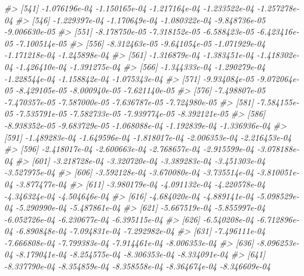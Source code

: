 \documentclass[
]{article}
\newenvironment{Shaded}{\begin{snugshade}}{\end{snugshade}}
\newcommand{\CommentTok}[1]{\textcolor[rgb]{0.56,0.35,0.01}{\textit{#1}}}
\begin{document}
\begin{Shaded}
\begin{Highlighting}[]
\CommentTok{\#\textgreater{} [541] {-}1.076196e{-}04 {-}1.150165e{-}04 {-}1.217164e{-}04 {-}1.233522e{-}04 {-}1.257278e{-}04}
\CommentTok{\#\textgreater{} [546] {-}1.229397e{-}04 {-}1.170649e{-}04 {-}1.080322e{-}04 {-}9.848736e{-}05 {-}9.006630e{-}05}
\CommentTok{\#\textgreater{} [551] {-}8.178750e{-}05 {-}7.318152e{-}05 {-}6.588423e{-}05 {-}6.423416e{-}05 {-}7.100514e{-}05}
\CommentTok{\#\textgreater{} [556] {-}8.312463e{-}05 {-}9.641054e{-}05 {-}1.071929e{-}04 {-}1.171218e{-}04 {-}1.245898e{-}04}
\CommentTok{\#\textgreater{} [561] {-}1.316879e{-}04 {-}1.383451e{-}04 {-}1.418302e{-}04 {-}1.426410e{-}04 {-}1.391275e{-}04}
\CommentTok{\#\textgreater{} [566] {-}1.344333e{-}04 {-}1.290279e{-}04 {-}1.228544e{-}04 {-}1.158842e{-}04 {-}1.075343e{-}04}
\CommentTok{\#\textgreater{} [571] {-}9.934084e{-}05 {-}9.072064e{-}05 {-}8.429105e{-}05 {-}8.000940e{-}05 {-}7.621140e{-}05}
\CommentTok{\#\textgreater{} [576] {-}7.498807e{-}05 {-}7.470357e{-}05 {-}7.587000e{-}05 {-}7.636787e{-}05 {-}7.724980e{-}05}
\CommentTok{\#\textgreater{} [581] {-}7.584155e{-}05 {-}7.535791e{-}05 {-}7.582733e{-}05 {-}7.939774e{-}05 {-}8.392121e{-}05}
\CommentTok{\#\textgreater{} [586] {-}8.938352e{-}05 {-}9.683729e{-}05 {-}1.068088e{-}04 {-}1.192839e{-}04 {-}1.336936e{-}04}
\CommentTok{\#\textgreater{} [591] {-}1.489283e{-}04 {-}1.649596e{-}04 {-}1.818017e{-}04 {-}2.006353e{-}04 {-}2.216453e{-}04}
\CommentTok{\#\textgreater{} [596] {-}2.418017e{-}04 {-}2.600663e{-}04 {-}2.768657e{-}04 {-}2.915599e{-}04 {-}3.078188e{-}04}
\CommentTok{\#\textgreater{} [601] {-}3.218728e{-}04 {-}3.320720e{-}04 {-}3.389283e{-}04 {-}3.451303e{-}04 {-}3.527975e{-}04}
\CommentTok{\#\textgreater{} [606] {-}3.592128e{-}04 {-}3.670080e{-}04 {-}3.735514e{-}04 {-}3.810051e{-}04 {-}3.877477e{-}04}
\CommentTok{\#\textgreater{} [611] {-}3.980179e{-}04 {-}4.091132e{-}04 {-}4.220578e{-}04 {-}4.346324e{-}04 {-}4.504646e{-}04}
\CommentTok{\#\textgreater{} [616] {-}4.684020e{-}04 {-}4.889141e{-}04 {-}5.098529e{-}04 {-}5.290990e{-}04 {-}5.487861e{-}04}
\CommentTok{\#\textgreater{} [621] {-}5.667519e{-}04 {-}5.855997e{-}04 {-}6.052726e{-}04 {-}6.230677e{-}04 {-}6.395115e{-}04}
\CommentTok{\#\textgreater{} [626] {-}6.540208e{-}04 {-}6.712896e{-}04 {-}6.890848e{-}04 {-}7.094831e{-}04 {-}7.292982e{-}04}
\CommentTok{\#\textgreater{} [631] {-}7.496111e{-}04 {-}7.666808e{-}04 {-}7.799383e{-}04 {-}7.914461e{-}04 {-}8.006353e{-}04}
\CommentTok{\#\textgreater{} [636] {-}8.096253e{-}04 {-}8.179041e{-}04 {-}8.254575e{-}04 {-}8.306353e{-}04 {-}8.334091e{-}04}
\CommentTok{\#\textgreater{} [641] {-}8.337790e{-}04 {-}8.354859e{-}04 {-}8.358558e{-}04 {-}8.364674e{-}04 {-}8.346609e{-}04}

\end{Highlighting}
\end{Shaded}
\end{document}
